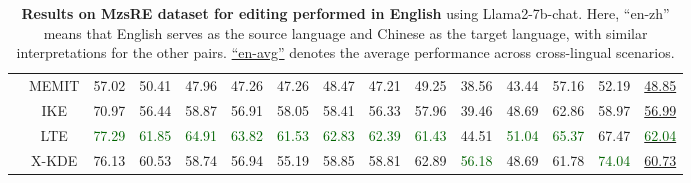 \begin{table*}[!h]
{\begin{tabular}{ccccccccccccccc}
           & MEMIT &  57.02 &  50.41 &  47.96 &  47.26 &  47.26 &  48.47 &  47.21 &  49.25 &  38.56 &  43.44 &  57.16 &  52.19 &  \underline{48.85} \\
           & IKE & 70.97 & 56.44 & 58.87 & 56.91 & 58.05 & 58.41 & 56.33 & 57.96 & 39.46 & 48.69 & 62.86 & 58.97 & \underline{56.99} \\
           & LTE & \textcolor{darkgreen}{77.29} & \textcolor{darkgreen}{61.85} & \textcolor{darkgreen}{64.91} & \textcolor{darkgreen}{63.82} & \textcolor{darkgreen}{61.53} & \textcolor{darkgreen}{62.83} & \textcolor{darkgreen}{62.39} & \textcolor{darkgreen}{61.43} & 44.51 & \textcolor{darkgreen}{51.04} & \textcolor{darkgreen}{65.37} & 67.47 & \underline{\textcolor{darkgreen}{62.04}} \\

           \cmidrule{2-15}
           & X-KDE & 76.13 & 60.53 & 58.74 & 56.94 & 55.19 & 58.85 & 58.81 & 62.89 & \textcolor{darkgreen}{56.18} & 48.69 & 61.78 & \textcolor{darkgreen}{74.04} & \underline{60.73} \\
           \bottomrule
        \end{tabular}
    }
    \caption{
    \textbf{Results on MzsRE dataset for editing performed in English} using Llama2-7b-chat. Here, ``en-zh'' means that English serves as the source language and Chinese as the target language, with similar interpretations for the other pairs. \underline{``en-avg''} denotes the average performance across cross-lingual scenarios.}
    \label{tab:ap-en-edit}
\end{table*}


